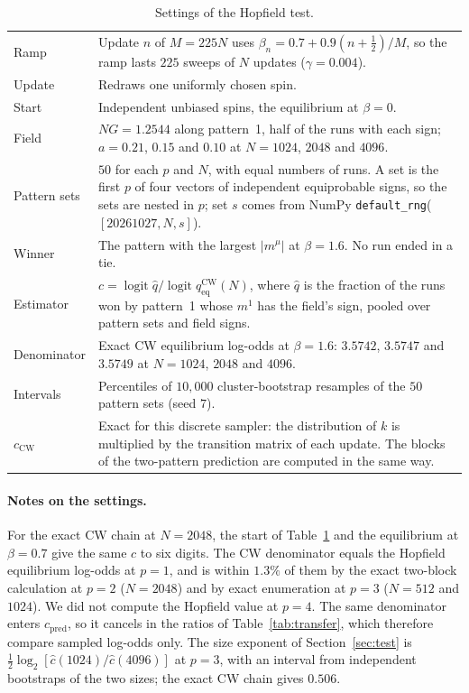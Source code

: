 \documentclass[final]{dynafront2026}
\newcommand{\qeq}{q_{\mathrm{eq}}}
\DeclareMathOperator{\logit}{logit}
\begin{document}
\begin{table}[!htb]
 \centering
 \caption{Settings of the Hopfield test.}
 \label{tab:settings}
 \small
 \begin{tabular}{@{}lp{}@{}}
 \toprule
 Ramp & Update $n$ of $M=225N$ uses $\beta_n=0.7+0.9(n+\tfrac12)/M$, so the ramp lasts $225$ sweeps of $N$ updates ($\gamma=0.004$).\\
 Update & Redraws one uniformly chosen spin.\\
 Start & Independent unbiased spins, the equilibrium at $\beta=0$.\\
 Field & $NG=1.2544$ along pattern~1, half of the runs with each sign; $a=0.21$, $0.15$ and $0.10$ at $N=1024$, $2048$ and $4096$.\\
 Pattern sets & $50$ for each $p$ and $N$, with equal numbers of runs. A set is the first $p$ of four vectors of independent equiprobable signs, so the sets are nested in $p$; set $s$ comes from NumPy \texttt{default\_rng}($[20261027,N,s]$).\\
 Winner & The pattern with the largest $|m^\mu|$ at $\beta=1.6$. No run ended in a tie.\\
 Estimator & $\widehat c=\logit\widehat q/\logit\qeq^{\mathrm{CW}}(N)$, where $\widehat q$ is the fraction of the runs won by pattern~1 whose $m^1$ has the field's sign, pooled over pattern sets and field signs.\\
 Denominator & Exact CW equilibrium log-odds at $\beta=1.6$: $3.5742$, $3.5747$ and $3.5749$ at $N=1024$, $2048$ and $4096$.\\
 Intervals & Percentiles of $10{,}000$ cluster-bootstrap resamples of the $50$ pattern sets (seed $7$).\\
 $c_{\mathrm{CW}}$ & Exact for this discrete sampler: the distribution of $k$ is multiplied by the transition matrix of each update. The blocks of the two-pattern prediction are computed in the same way.\\
 \bottomrule
 \end{tabular}
\end{table}

\paragraph{Notes on the settings.}
For the exact CW chain at $N=2048$, the start of Table~\ref{tab:settings} and
the equilibrium at $\beta=0.7$ give the same $c$ to six digits. The CW
denominator equals the Hopfield equilibrium log-odds at $p=1$, and is within
$1.3\%$ of them by the exact two-block calculation at $p=2$ ($N=2048$) and by
exact enumeration at $p=3$ ($N=512$ and $1024$). We did not compute the
Hopfield value at $p=4$. The same denominator enters $c_{\mathrm{pred}}$, so
it cancels in the ratios of Table~\ref{tab:transfer}, which therefore compare
sampled log-odds only. The size exponent of Section~\ref{sec:test} is
$\tfrac12\log_2[\widehat c(1024)/\widehat c(4096)]$ at $p=3$, with an
interval from independent bootstraps of the two sizes; the exact CW chain
gives $0.506$.
\end{document}
